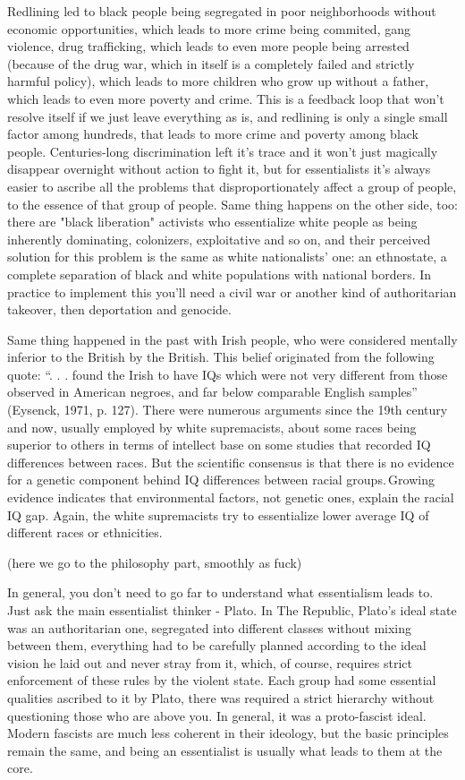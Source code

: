\documentclass[12 pt, a4paper]{article}
\begin{document}
Redlining led to black people being segregated in poor neighborhoods without economic opportunities, which leads to more crime being commited, gang violence, drug trafficking, which leads to even more people being arrested (because of the drug war, which in itself is a completely failed and strictly harmful policy), which leads to more children who grow up without a father, which leads to even more poverty and crime. This is a feedback loop that won't resolve itself if we just leave everything as is, and redlining is only a single small factor among hundreds, that leads to more crime and poverty among black people. Centuries-long discrimination left it's trace and it won't just magically disappear overnight without action to fight it, but for essentialists it's always easier to ascribe all the problems that disproportionately affect a group of people, to the essence of that group of people. Same thing happens on the other side, too: there are "black liberation" activists who essentialize white people as being inherently dominating, colonizers, exploitative and so on, and their perceived solution for this problem is the same as white nationalists' one: an ethnostate, a complete separation of black and white populations with national borders. In practice to implement this you'll need a civil war or another kind of authoritarian takeover, then deportation and genocide. 

Same thing happened in the past with Irish people, who were considered mentally inferior to the British by the British. This belief originated from the following quote: “. . . found the Irish to have IQs which were not very different from those observed in American negroes, and far below comparable English samples” (Eysenck, 1971, p. 127). There were numerous arguments since the 19th century and now, usually employed by white supremacists, about some races being superior to others in terms of intellect base on some studies that recorded IQ differences between races. But the scientific consensus is that there is no evidence for a genetic component behind IQ differences between racial groups. Growing evidence indicates that environmental factors, not genetic ones, explain the racial IQ gap. Again, the white supremacists try to essentialize lower average IQ of different races or ethnicities. 

(here we go to the philosophy part, smoothly as fuck) 

In general, you don't need to go far to understand what essentialism leads to. Just ask the main essentialist thinker - Plato. In The Republic, Plato's ideal state was an authoritarian one, segregated into different classes without mixing between them, everything had to be carefully planned according to the ideal vision he laid out and never stray from it, which, of course, requires strict enforcement of these rules by the violent state. Each group had some essential qualities ascribed to it by Plato, there was required a strict hierarchy without questioning those who are above you. In general, it was a proto-fascist ideal. Modern fascists are much less coherent in their ideology, but the basic principles remain the same, and being an essentialist is usually what leads to them at the core. 
\end{document}
